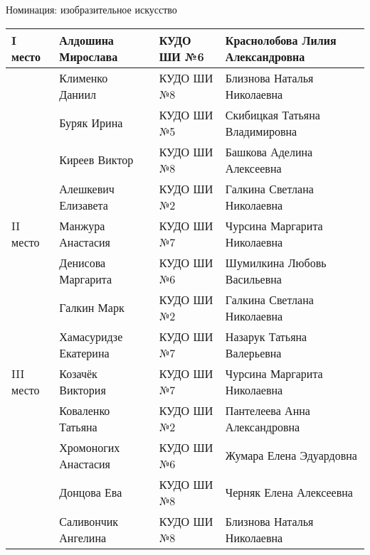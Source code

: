  
 
 
 
 

Номинация: изобразительное искусство

\begin{longtable}{|l|l|l|l|}
\hline I место     & Алдошина Мирослава    & КУДО ШИ №6         & Краснолобова Лилия Александровна \\
\hline             & Клименко Даниил       & КУДО ШИ №8         & Близнова Наталья Николаевна      \\
\hline             & Буряк Ирина           & КУДО ШИ №5         & Скибицкая Татьяна Владимировна   \\
\hline             & Киреев Виктор         & КУДО ШИ №8         & Башкова Аделина Алексеевна       \\
\hline             & Алешкевич Елизавета   & КУДО ШИ №2         & Галкина Светлана Николаевна      \\
\hline II место    & Манжура Анастасия     & КУДО ШИ №7         & Чурсина Маргарита Николаевна     \\
\hline             & Денисова Маргарита    & КУДО ШИ №6         & Шумилкина Любовь Васильевна      \\
\hline             & Галкин Марк           & КУДО ШИ №2         & Галкина Светлана Николаевна      \\
\hline             & Хамасуридзе Екатерина & КУДО ШИ №7         & Назарук Татьяна Валерьевна       \\
\hline III место   & Козачёк Виктория      & КУДО ШИ №7         & Чурсина Маргарита Николаевна     \\
\hline             & Коваленко Татьяна     & КУДО ШИ №2         & Пантелеева Анна Александровна    \\
\hline             & Хромоногих Анастасия  & КУДО ШИ №6         & Жумара Елена Эдуардовна          \\
\hline             & Донцова Ева           & КУДО ШИ №8         & Черняк Елена Алексеевна          \\
\hline             & Саливончик Ангелина   & КУДО ШИ №8         & Близнова Наталья Николаевна      \\

\end{longtable}
